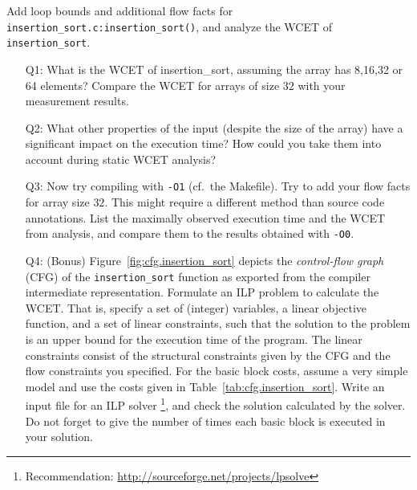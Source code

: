 \label{problem:2}

Add loop bounds and additional flow facts for
\texttt{insertion\_sort.c:insertion\_sort()}, and analyze the WCET of
\texttt{insertion\_sort}.

\begin{itemize}

\item[Q1:]
  What is the WCET of insertion\_sort, assuming the array has 8,16,32 or 64
  elements? Compare the WCET for arrays of size $32$ with your measurement
  results.

\item[Q2:]
  What other properties of the input (despite the size of the array) have a
  significant impact on the execution time? How could you take them into
  account during static WCET analysis?

\item[Q3:]
  Now try compiling with \texttt{-O1} (cf.\ the Makefile).  Try to add your
  flow facts for array size $32$.  This might require a different method than
  source code annotations.  List the maximally observed execution time and the
  WCET from analysis, and compare them to the results obtained with
  \texttt{-O0}.

\item[Q4:] (Bonus)
  Figure~\ref{fig:cfg.insertion_sort} depicts the \emph{control-flow graph}
  (CFG) of the \texttt{insertion\_sort} function as exported from the compiler
  intermediate representation.
  Formulate an ILP problem to calculate the WCET.  That is, specify a set of
  (integer) variables, a linear objective function, and a set of linear
  constraints, such that the solution to the problem is an upper bound for the
  execution time of the program.  The linear constraints consist of the
  structural constraints given by the CFG and the flow constraints you
  specified.
  For the basic block costs, assume a very simple model and use the costs
  given in Table~\ref{tab:cfg.insertion_sort}.
  Write an input file for an ILP solver%
  \footnote{Recommendation: \url{http://sourceforge.net/projects/lpsolve}},
  and check the solution calculated by the solver.
  Do not forget to give the number of times each basic block is executed in
  your solution.

\end{itemize}


